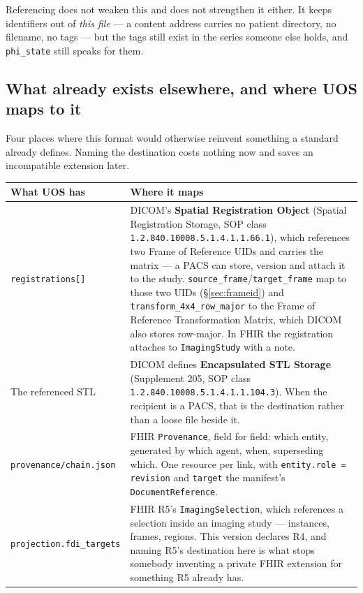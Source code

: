 \documentclass[11pt,a4paper]{article}
\newcommand{\code}[1]{\texttt{\small #1}}
\begin{document}
\vspace{6px}
Referencing does not weaken this and does not strengthen it either. It keeps identifiers out
of \emph{this file} --- a content address carries no patient directory, no filename, no tags
--- but the tags still exist in the series someone else holds, and \code{phi\_state} still
speaks for them.

\subsection{What already exists elsewhere, and where UOS maps to it}\label{sec:mappings}

Four places where this format would otherwise reinvent something a standard already
defines. Naming the destination costs nothing now and saves an incompatible extension
later.

\begin{longtable}{L{4.0cm} L{11.4cm}}
\toprule
\textbf{What UOS has} & \textbf{Where it maps}\\
\midrule
\endhead
\code{registrations[]} & DICOM's \textbf{Spatial Registration Object} (Spatial Registration
Storage, SOP class \code{1.2.840.10008.5.1.4.1.1.66.1}), which references two Frame of
Reference UIDs and carries the matrix --- a PACS can store, version and attach it to the
study. \code{source\_frame}/\code{target\_frame} map to those two UIDs
(\S\ref{sec:frameid}) and \code{transform\_4x4\_row\_major} to the Frame of Reference
Transformation Matrix, which DICOM also stores row-major. In FHIR the registration attaches
to \code{ImagingStudy} with a note.\\
The referenced STL & DICOM defines \textbf{Encapsulated STL Storage} (Supplement 205, SOP
class \code{1.2.840.10008.5.1.4.1.1.104.3}). When the recipient is a PACS, that is the
destination rather than a loose file beside it.\\
\code{provenance/chain.json} & FHIR \code{Provenance}, field for field: which entity,
generated by which agent, when, superseding which. One resource per link, with
\code{entity.role = revision} and \code{target} the manifest's \code{DocumentReference}.\\
\code{projection.fdi\_targets} & FHIR R5's \code{ImagingSelection}, which references a
selection inside an imaging study --- instances, frames, regions. This version declares R4, and
naming R5's destination here is what stops somebody inventing a private FHIR extension for
something R5 already has.\\
\bottomrule
\end{longtable}
\end{document}
